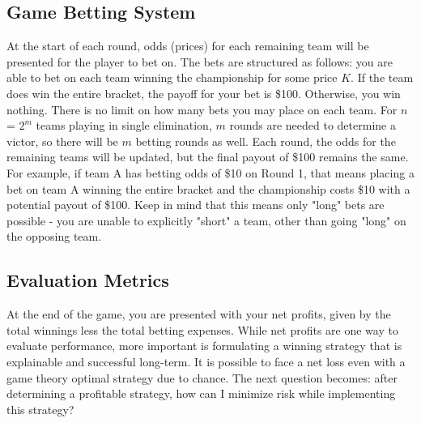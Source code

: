 \documentclass{article}
\begin{document}
\subsection{Game Betting System}
At the start of each round, odds (prices) for each remaining team will be presented for the player to bet on. The bets are structured as follows: you are able to bet on each team winning the championship for some price $K$. If the team does win the entire bracket, the payoff for your bet is \$100. Otherwise, you win nothing. There is no limit on how many bets you may place on each team.
\newline
\newline
For \(n\) = \(2^m\) teams playing in single elimination, $m$ rounds are needed to determine a victor, so there will be $m$ betting rounds as well. Each round, the odds for the remaining teams will be updated, but the final payout of \$100 remains the same.
\newline
\newline
For example, if team A has betting odds of \$10 on Round 1, that means placing a bet on team A winning the entire bracket and the championship costs \$10 with a potential payout of \$100. Keep in mind that this means only "long" bets are possible - you are unable to explicitly "short" a team, other than going "long" on the opposing team.
\subsection{Evaluation Metrics}
At the end of the game, you are presented with your net profits, given by the total winnings less the total betting expenses. While net profits are one way to evaluate performance, more important is formulating a winning strategy that is explainable and successful long-term. It is possible to face a net loss even with a game theory optimal strategy due to chance. The next question becomes: after determining a profitable strategy, how can I minimize risk while implementing this strategy?
\end{document}
